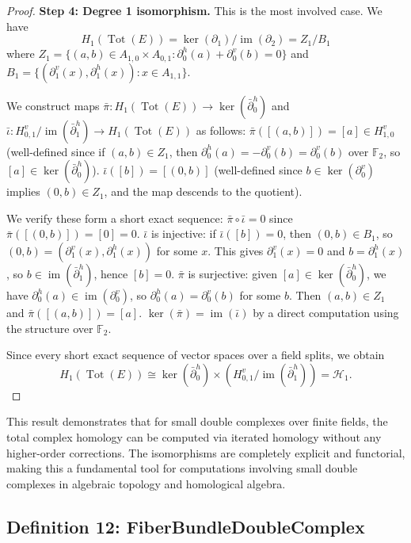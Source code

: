 \documentclass[11pt]{article}
\theoremstyle{plain}
\theoremstyle{definition}
\theoremstyle{remark}
\renewcommand{\ker}{\operatorname{ker}}
\begin{document}
\begin{proof}
\textbf{Step 4: Degree 1 isomorphism.} This is the most involved case. We have
\[
H_1(\operatorname{Tot}(E)) = \ker(\partial_1)/\operatorname{im}(\partial_2) = Z_1/B_1
\]
where $Z_1 = \{(a,b) \in A_{1,0} \times A_{0,1} : \partial^h_0(a) + \partial^v_0(b) = 0\}$ and $B_1 = \{(\partial^v_1(x), \partial^h_1(x)) : x \in A_{1,1}\}$.

We construct maps $\bar{\pi} : H_1(\operatorname{Tot}(E)) \to \ker(\bar{\partial}^h_0)$ and $\bar{\iota} : H^v_{0,1}/\operatorname{im}(\bar{\partial}^h_1) \to H_1(\operatorname{Tot}(E))$ as follows:
$\bar{\pi}([(a,b)]) = [a] \in H^v_{1,0}$ (well-defined since if $(a,b) \in Z_1$, then $\partial^h_0(a) = -\partial^v_0(b) = \partial^v_0(b)$ over $\mathbb{F}_2$, so $[a] \in \ker(\bar{\partial}^h_0)$).
$\bar{\iota}([b]) = [(0,b)]$ (well-defined since $b \in \ker(\partial^v_0)$ implies $(0,b) \in Z_1$, and the map descends to the quotient).

We verify these form a short exact sequence:
$\bar{\pi} \circ \bar{\iota} = 0$ since $\bar{\pi}([(0,b)]) = [0] = 0$.
$\bar{\iota}$ is injective: if $\bar{\iota}([b]) = 0$, then $(0,b) \in B_1$, so $(0,b) = (\partial^v_1(x), \partial^h_1(x))$ for some $x$. This gives $\partial^v_1(x) = 0$ and $b = \partial^h_1(x)$, so $b \in \operatorname{im}(\bar{\partial}^h_1)$, hence $[b] = 0$.
$\bar{\pi}$ is surjective: given $[a] \in \ker(\bar{\partial}^h_0)$, we have $\partial^h_0(a) \in \operatorname{im}(\partial^v_0)$, so $\partial^h_0(a) = \partial^v_0(b)$ for some $b$. Then $(a,b) \in Z_1$ and $\bar{\pi}([(a,b)]) = [a]$.
$\ker(\bar{\pi}) = \operatorname{im}(\bar{\iota})$ by a direct computation using the structure over $\mathbb{F}_2$.

Since every short exact sequence of vector spaces over a field splits, we obtain
\[
H_1(\operatorname{Tot}(E)) \cong \ker(\bar{\partial}^h_0) \times (H^v_{0,1}/\operatorname{im}(\bar{\partial}^h_1)) = \mathcal{H}_1.
\]
\end{proof}

This result demonstrates that for small double complexes over finite fields, the total complex homology can be computed via iterated homology without any higher-order corrections. The isomorphisms are completely explicit and functorial, making this a fundamental tool for computations involving small double complexes in algebraic topology and homological algebra.

\vspace{1em}

\subsection{Definition 12: FiberBundleDoubleComplex}
\end{document}
